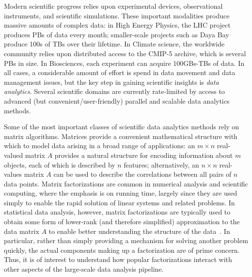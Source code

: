 Modern scientific progress relies upon experimental devices, observational instruments, and scientific simulations. These important modalities produce massive amounts of complex data: in High Energy Physics, the LHC project produces PBs of data every month; smaller-scale projects such as Daya Bay produce 100s of TBs over their lifetime. In Climate science, the worldwide community relies upon distributed access to the CMIP-5 archive, which is several PBs in size. In  Biosciences, each experiment can acquire 100GBs-TBs of data. In all cases, a considerable amount of effort is spend in data movement and data management issues, but the key step in gaining scientific insights is \emph{data analytics}. Several scientific domains are currently rate-limited by access to advanced (but convenient/user-friendly) parallel and scalable data analytics methods. 

Some of the most important classes of scientific data analytics methods rely on matrix algorithms. 
Matrices provide a convenient mathematical structure with which to model data arising in a broad range of applications: an $m \times n$ real-valued matrix $A$ provides a natural structure for encoding information about $m$ objects, each of which is described by $n$ features; alternatively, an $n \times n$ real-values matrix $A$ can be used to describe the correlations between all pairs of $n$ data points. 
Matrix factorizations are common in numerical analysis and scientific computing, where the emphasis is on running time, largely since they are used simply to enable the rapid solution of linear systems and related problems.
In statistical data analysis, however, matrix factorizations are typically used to obtain some form of lower-rank (and therefore simplified) approximation to the data matrix $A$ to enable better understanding the structure of the data~\cite{HMH00}.
In particular, rather than simply providing a mechanism for solving another problem quickly, the actual components making up a factorization are of prime concern.
Thus, it is of interest to understand how popular factorizations interact with other aspects of the large-scale data analysis pipeline.

